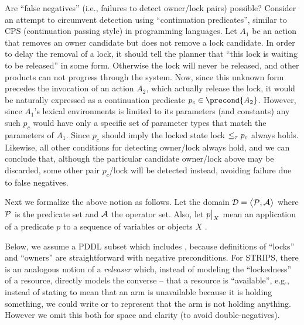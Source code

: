 Are ``false negatives'' (i.e., failures to detect owner/lock pairs) possible?
Consider an attempt to circumvent  detection using ``continuation predicates'',
similar to CPS (continuation passing style) in programming languages.
Let $A_1$ be an action that removes an owner candidate but does not remove a lock candidate.
In order to delay the removal of a lock, it should tell the planner that
``this lock is waiting to be released'' in some form.
Otherwise the lock will never be released, and other products can not progress through the system.
%
Now, since this unknown form precedes the invocation of 
an action $A_2$, which actually release the lock,
it would be naturally expressed as a continuation predicate $p_c \in \precond{A_2}$.
However, since $A_1$'s lexical environments is limited to its parameters 
(and constants) 
any such $p_c$
would have only a specific set of parameter types that match the parameters of $A_1$.
Since $p_c$ should imply the locked state lock $\leq_\tau p_c$ always holds.
Likewise, all other conditions for detecting owner/lock always hold, and
we can conclude that, although the particular candidate owner/lock above may be discarded,
some other pair $p_c$/lock will be detected instead, avoiding failure due to false negatives.


Next we formalize the above notion as follows.
Let the domain ${\cal D} = \big<
{\cal P},{\cal A} \big>$ where ${\cal P}$ is the predicate set and
${\cal A}$ the operator set.
Also, let $p\big|_{X}$ mean an application of a predicate $p$
 to a sequence of variables or objects $X$ .

Below, we assume a PDDL subset which includes , because
definitions of ``locks'' and ``owners'' are straightforward with negative preconditions.
For STRIPS, there is an analogous notion of a {\em releaser} which,
instead of modeling the ``lockedness'' of a resource,
directly models the converse -- that a resource is ``available'', e.g., 
instead of stating  to mean that an arm is
unavailable because it is holding something, we could write  or 
to represent that the arm is not holding anything.
However we omit this both for space and clarity (to avoid double-negatives).

